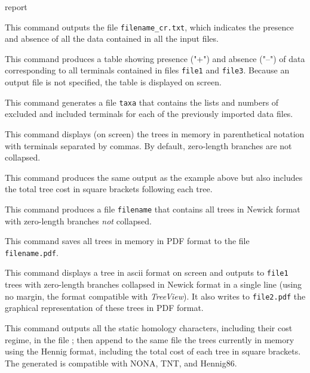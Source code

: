 \begin{command}{report}{}
\begin{poyexamples}
		{This command outputs the file \texttt{filename\_cr.txt}, which indicates 
		the presence and absence of all the data contained in all the input files.}
		
		{This command produces a table showing presence ("+")
		and absence ("--") of data corresponding to all terminals contained
		in files \texttt{file1} and \texttt{file3}. Because an output
		file is not specified, the table is displayed on screen.}

		{This command generates a file \texttt{taxa} that contains the
		lists and numbers of excluded and included terminals for each of the previously
		imported data files.}

            {This command displays (on screen) the trees in memory in parenthetical
            notation with terminals separated by commas.  By default, zero-length branches 
            are not collapsed.}

            {This command produces the same output as the example above
            but also includes the total tree cost in square brackets
            following each tree.}

            {This command produces a file \texttt{filename} that contains
            all trees in Newick format with zero-length branches \emph{not}
            collapsed.}
		
            {This command saves all trees in memory in
            PDF format to the file \texttt{filename.pdf}.}

		{This command displays a tree in ascii format on screen and outputs
		to \texttt{file1} trees with zero-length branches collapsed in Newick format
		in a single line (using no margin, the format compatible with \emph{TreeView}). It
		also writes to \texttt{file2.pdf} the graphical representation of these trees in
		PDF format.}

            {This command outputs all the static homology characters, including their cost
            regime, in the file ; then append to the same
            file the trees currently in memory using the Hennig format, 
            including the total cost of each tree in square brackets. The
            generated  is compatible with NONA, TNT, and
            Hennig86.
             }
            

\end{poyexamples}
\end{command}
